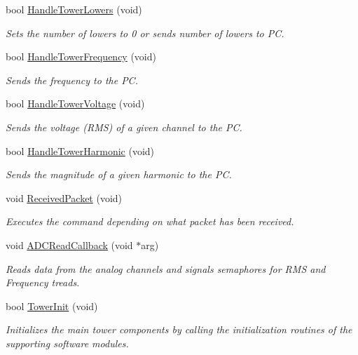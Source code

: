 \begin{DoxyCompactItemize}
bool \hyperlink{group__main__module_gaf1ede95533f72cd04d012524fcf9c3c1}{Handle\+Tower\+Lowers} (void)
\begin{DoxyCompactList}\small\item\em Sets the number of lowers to 0 or sends number of lowers to P\+C. \end{DoxyCompactList}\item 
bool \hyperlink{group__main__module_gab99b27ef454ed128037af63baf5fea1e}{Handle\+Tower\+Frequency} (void)
\begin{DoxyCompactList}\small\item\em Sends the frequency to the P\+C. \end{DoxyCompactList}\item 
bool \hyperlink{group__main__module_ga4c47eb6ca18fdb7b9aa5a78e34a377f2}{Handle\+Tower\+Voltage} (void)
\begin{DoxyCompactList}\small\item\em Sends the voltage (R\+M\+S) of a given channel to the P\+C. \end{DoxyCompactList}\item 
bool \hyperlink{group__main__module_ga709133d753e53f49f246ed96eef34996}{Handle\+Tower\+Harmonic} (void)
\begin{DoxyCompactList}\small\item\em Sends the magnitude of a given harmonic to the P\+C. \end{DoxyCompactList}\item 
void \hyperlink{group__main__module_gaf57dd4c5e7e444cfe5571d411f9548c9}{Received\+Packet} (void)
\begin{DoxyCompactList}\small\item\em Executes the command depending on what packet has been received. \end{DoxyCompactList}\item 
void \hyperlink{group__main__module_ga683da8b9767f92e98d83d025e74f9d36}{A\+D\+C\+Read\+Callback} (void $\ast$arg)
\begin{DoxyCompactList}\small\item\em Reads data from the analog channels and signals semaphores for R\+M\+S and Frequency treads. \end{DoxyCompactList}\item 
bool \hyperlink{group__main__module_gaeda7b585d318b7b1476285b82b6fed11}{Tower\+Init} (void)
\begin{DoxyCompactList}\small\item\em Initializes the main tower components by calling the initialization routines of the supporting software modules. \end{DoxyCompactList}\item 

\end{DoxyCompactItemize}
